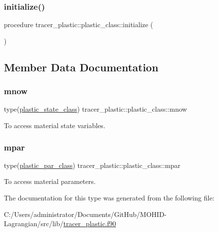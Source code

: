 \subsubsection{\texorpdfstring{initialize()}{initialize()}}
{\footnotesize\ttfamily procedure tracer\+\_\+plastic\+::plastic\+\_\+class\+::initialize (\begin{DoxyParamCaption}{ }\end{DoxyParamCaption})\hspace{0.3cm}{\ttfamily [private]}}



\subsection{Member Data Documentation}
\mbox{\label{structtracer__plastic_1_1plastic__class_ab03eb153c19d97a9ac0f76bb3218d242}} 
\subsubsection{\texorpdfstring{mnow}{mnow}}
{\footnotesize\ttfamily type(\hyperlink{structtracer__plastic_1_1plastic__state__class}{plastic\+\_\+state\+\_\+class}) tracer\+\_\+plastic\+::plastic\+\_\+class\+::mnow\hspace{0.3cm}{\ttfamily [private]}}



To access material state variables. 

\mbox{\label{structtracer__plastic_1_1plastic__class_a5f8a2635cad07f5b1e30e97cf7754e98}} 
\subsubsection{\texorpdfstring{mpar}{mpar}}
{\footnotesize\ttfamily type(\hyperlink{structtracer__plastic_1_1plastic__par__class}{plastic\+\_\+par\+\_\+class}) tracer\+\_\+plastic\+::plastic\+\_\+class\+::mpar\hspace{0.3cm}{\ttfamily [private]}}



To access material parameters. 



The documentation for this type was generated from the following file\+:\begin{DoxyCompactItemize}
\item 
C\+:/\+Users/administrator/\+Documents/\+Git\+Hub/\+M\+O\+H\+I\+D-\/\+Lagrangian/src/lib/\hyperlink{tracer__plastic_8f90}{tracer\+\_\+plastic.\+f90}\end{DoxyCompactItemize}
